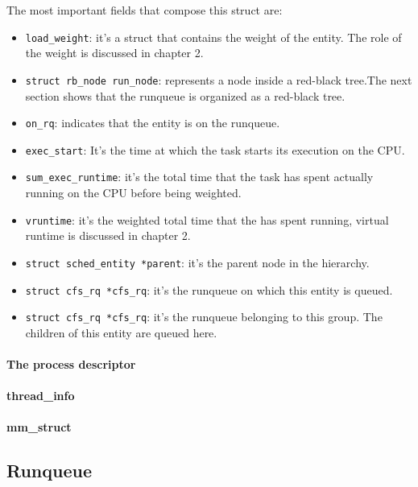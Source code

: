 \documentclass[10pt, oneside]{book}
\begin{document}
The most important fields that compose this struct are:
\begin{itemize}
    \item \verb|load_weight|: it's a struct that contains the weight of the entity. The role of the weight is discussed in chapter 2.
    \item \verb|struct rb_node run_node|: represents a node inside a red-black tree.The next section shows that the runqueue is organized as a red-black tree.
    \item \verb|on_rq|: indicates that the entity is on the runqueue.
    \item \verb|exec_start|: It's the time at which the task starts its execution on the CPU.
    \item \verb|sum_exec_runtime|: it's the total time that the task has spent actually running on the CPU before being weighted.
    \item \verb|vruntime|: it's the weighted total time that the has spent running, virtual runtime is discussed in chapter 2.
    \item \verb|struct sched_entity *parent|: it's the parent node in the hierarchy.
    \item \verb|struct cfs_rq *cfs_rq|: it's the runqueue on which this entity is queued.
    \item \verb|struct cfs_rq *cfs_rq|: it's the runqueue belonging to this group. The children of this entity are queued here.
\end{itemize}
\paragraph{The process descriptor}
\paragraph{thread\_info}
\paragraph{mm\_struct}

\subsection{Runqueue}

\end{document}
